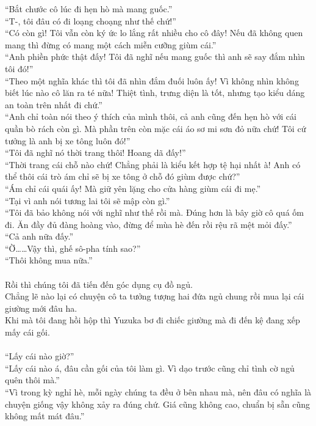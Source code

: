 \documentclass[12pt,a4paper, twosides]{book}
\begin{document}
“Bắt chước cô lúc đi hẹn hò mà mang guốc.”\\
“T-, tôi đâu có đi loạng choạng như thế chứ!”\\
“Có còn gì! Tôi vẫn còn ký ức lo lắng rất nhiều cho cô đây! Nếu đã không quen mang thì đừng có mang một cách miễn cưỡng giùm cái.”\\
“Anh phiền phức thật đấy! Tôi đã nghĩ nếu mang guốc thì anh sẽ say đắm nhìn tôi đó!”\\
“Theo một nghĩa khác thì tôi đã nhìn đắm đuối luôn ấy! Vì không nhìn không biết lúc nào cô lăn ra té nữa! Thiệt tình, trưng diện là tốt, nhưng tạo kiểu dáng an toàn trên nhất đi chứ.”\\
“Anh chỉ toàn nói theo ý thích của mình thôi, cả anh cũng đến hẹn hò với cái quần bò rách còn gì. Mà phần trên còn mặc cái áo sơ mi sơn đỏ nữa chứ! Tôi cứ tưởng là anh bị xe tông luôn đó!”\\
“Tôi đã nghĩ nó thời trang thôi! Hoang dã đấy!”\\
“Thời trang cái chỗ nào chứ! Chẳng phải là kiểu kết hợp tệ hại nhất à! Anh có thể thôi cái trò ám chỉ sẽ bị xe tông ở chỗ đó giùm được chứ?”\\
“Ám chỉ cái quái ấy! Mà giữ yên lặng cho cửa hàng giùm cái đi mẹ.”\\
“Tại vì anh nói tương lai tôi sẽ mập còn gì.”\\
“Tôi đã bảo không nói với nghĩ như thế rồi mà. Đúng hơn là bây giờ cô quá ốm đi. Ăn đầy đủ đàng hoàng vào, đừng để mùa hè đến rồi rệu rã mệt mỏi đấy.”\\
“Cả anh nữa đấy.”\\
“Ờ……Vậy thì, ghế sô-pha tính sao?”\\
“Thôi không mua nữa.”\\
\\
Rồi thì chúng tôi đã tiến đến góc dụng cụ đồ ngủ.\\
Chẳng lẽ nào lại có chuyện cô ta tưởng tượng hai đứa ngủ chung rồi mua lại cái giường mới đâu ha.\\
Khi mà tôi đang hồi hộp thì Yuzuka bơ đi chiếc giường mà đi đến kệ đang xếp mấy cái gối.\\
\\
“Lấy cái nào giờ?”\\
“Lấy cái nào á, đâu cần gối của tôi làm gì. Vì dạo trước cũng chỉ tình cờ ngủ quên thôi mà.”\\
“Vì trong kỳ nghỉ hè, mỗi ngày chúng ta đều ở bên nhau mà, nên đâu có nghĩa là chuyện giống vậy không xảy ra đúng chứ. Giá cũng không cao, chuẩn bị sẵn cũng không mất mát đâu.”\\
\end{document}
